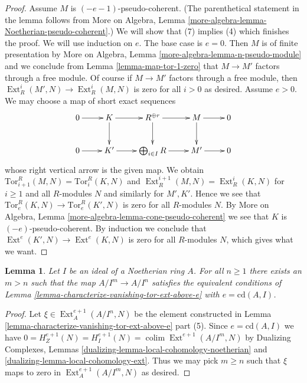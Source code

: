 \documentclass{stacks-project}
\theoremstyle{plain}
\newtheorem{lemma}[subsection]{Lemma}
\theoremstyle{definition}
\theoremstyle{remark}
\numberwithin{equation}{subsection}
\def\colim{\mathop{\mathrm{colim}}\nolimits}
\def\Ext{\mathop{\mathrm{Ext}}\nolimits}
\begin{document}
\begin{proof}
\medskip\noindent
Assume $M$ is $(-e - 1)$-pseudo-coherent. (The parenthetical statement
in the lemma follows from More on Algebra, Lemma
\ref{more-algebra-lemma-Noetherian-pseudo-coherent}.)
We will show that (7) implies (4) which
finishes the proof. We will use induction on $e$.
The base case is $e = 0$. Then $M$ is of finite presentation by
More on Algebra, Lemma \ref{more-algebra-lemma-n-pseudo-module}
and we conclude from Lemma \ref{lemma-map-tor-1-zero} that
$M \to M'$ factors through a free module. Of course if $M \to M'$
factors through a free module, then $\Ext^i_R(M', N) \to \Ext^i_R(M, N)$
is zero for all $i > 0$ as desired.
Assume $e > 0$. We may choose a map of short exact sequences
$$
\xymatrix{
0 \ar[r] &
K \ar[r] \ar[d] &
R^{\oplus r} \ar[r] \ar[d] &
M \ar[r] \ar[d] &
0 \\
0 \ar[r] &
K' \ar[r] &
\bigoplus_{i \in I} R \ar[r] &
M' \ar[r] &
0
}
$$
whose right vertical arrow is the given map. We obtain
$\text{Tor}_{i + 1}^R(M, N) = \text{Tor}^R_i(K, N)$
and $\Ext^{i + 1}_R(M, N) = \Ext^i_R(K, N)$ for $i \geq 1$
and all $R$-modules $N$ and similarly for $M', K'$.
Hence we see that $\text{Tor}_e^R(K, N) \to \text{Tor}_e^R(K', N)$
is zero for all $R$-modules $N$. By More on Algebra, Lemma
\ref{more-algebra-lemma-cone-pseudo-coherent} we see that $K$
is $(-e)$-pseudo-coherent. By induction we conclude that
$\Ext^e(K', N) \to \Ext^e(K, N)$ is zero for all $R$-modules
$N$, which gives what we want.
\end{proof}

\begin{lemma}
\label{lemma-cd-sequence-Koszul}
Let $I$ be an ideal of a Noetherian ring $A$.
For all $n \geq 1$ there exists an $m > n$ such that the map
$A/I^m \to A/I^n$ satisfies the equivalent conditions of
Lemma \ref{lemma-characterize-vanishing-tor-ext-above-e} with
$e = \text{cd}(A, I)$.
\end{lemma}

\begin{proof}
Let $\xi \in \Ext^{e + 1}_A(A/I^n, N)$ be the element constructed in
Lemma \ref{lemma-characterize-vanishing-tor-ext-above-e} part (5).
Since $e = \text{cd}(A, I)$ we have
$0 = H^{e + 1}_Z(N) = H^{e + 1}_I(N) = \colim \Ext^{e + 1}(A/I^m, N)$
by Dualizing Complexes, Lemmas
\ref{dualizing-lemma-local-cohomology-noetherian} and
\ref{dualizing-lemma-local-cohomology-ext}.
Thus we may pick $m \geq n$ such that $\xi$ maps to
zero in $\Ext^{e + 1}_A(A/I^m, N)$ as desired.
\end{proof}
\end{document}
